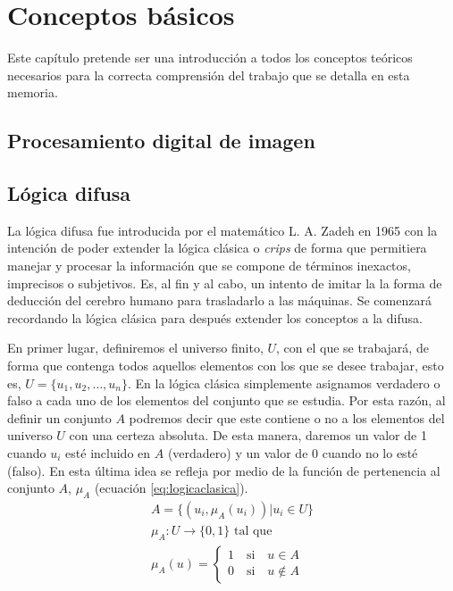 \chapter{Conceptos básicos}\label{preliminares}\label{basicos}

Este capítulo pretende ser una introducción a todos los conceptos teóricos necesarios para la correcta comprensión del trabajo que se detalla en esta memoria. 


\section{Procesamiento digital de imagen}\label{sec:procesamiento}



\section{Lógica difusa}\label{sec:logicadifusa}
La lógica difusa fue introducida por el matemático L. A. Zadeh \cite{art:zadeh} en 1965 con la intención de poder extender la lógica clásica o {\em crips} de forma que permitiera manejar y procesar la información que se compone de términos inexactos, imprecisos o subjetivos. Es, al fin y al cabo, un intento de imitar la la forma de deducción del cerebro humano para trasladarlo a las máquinas. Se comenzará recordando la lógica clásica para después extender los conceptos a la difusa.

En primer lugar, definiremos el universo finito, $U$,  con el que se  trabajará, de forma que contenga todos aquellos elementos con los que se desee trabajar, esto es, $U = \{u_{1}, u_{2}, \dots, u_{n}\}$. En la lógica clásica simplemente asignamos verdadero o falso a cada uno de los elementos del conjunto que se estudia. Por esta razón, al definir un conjunto $A$ podremos decir que este contiene o no a los elementos del universo $U$ con una certeza absoluta. De esta manera, daremos un valor de 1 cuando $u_{i}$ esté incluido en $A$ (verdadero) y un valor de 0 cuando no lo esté (falso). En esta última idea se refleja por medio de la función de pertenencia al conjunto  $A$, $\mu_{A}$ (ecuación \ref{eq:logicaclasica}).
\begin{equation}\label{eq:logicaclasica}
\begin{aligned} 
	A = \{(u_{i}, \mu_{A}(u_{i})) | u_{i}\in U\}\\
	\mu_{A}:U\rightarrow \{0,1\} \text{ tal que}\\
	\mu_{A}(u) = \left\{ \begin{aligned}
		1 \quad\text{si}\quad u\in A\\
		0 \quad\text{si}\quad u\notin A
 	\end{aligned}\right.
\end{aligned}
\end{equation}

